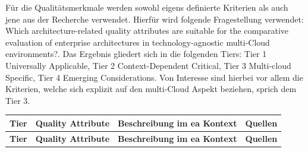 Für die Qualitätsmerkmale werden sowohl eigens definierte Kriterien als auch jene aus der Recherche verwendet. Hierfür wird folgende Fragestellung verwendet: \flqq Which architecture-related quality attributes are suitable for the comparative evaluation of enterprise architectures in technology-agnostic multi-Cloud environments?\frqq. Das Ergebnis gliedert sich in die folgenden Tiers: Tier 1 Universally Applicable, Tier 2 Context-Dependent Critical, Tier 3 Multi-cloud Specific, Tier 4 Emerging Considerations. Von Interesse sind hierbei vor allem die Kriterien, welche sich explizit auf den multi-Cloud Aspekt beziehen, sprich dem Tier 3.

\begin{longtable}{|L{1cm}|L{3cm}|p{\dimexpr\textwidth-8cm-6\arrayrulewidth}|L{4cm}|}
    \hline

    \textbf{Tier} & \textbf{Quality Attribute} & \textbf{Beschreibung im \ac{ea} Kontext} & \textbf{Quellen} \\
    \hline
    \endfirsthead

    \hline
    \textbf{Tier} & \textbf{Quality Attribute} & \textbf{Beschreibung im \ac{ea} Kontext} & \textbf{Quellen} \\
    \hline
    \endhead


\end{longtable}
